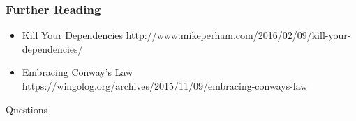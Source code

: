 \documentclass{beamer}
\begin{document}
\begin{frame}
  \frametitle{Further Reading}
  \begin{itemize}
  \item Kill Your Dependencies http://www.mikeperham.com/2016/02/09/kill-your-dependencies/
  \item Embracing Conway's Law https://wingolog.org/archives/2015/11/09/embracing-conways-law
  \end{itemize}
\end{frame}
\begin{frame}
  \centerline{\color{blue}\Large Questions}
\end{frame}
\end{document}
